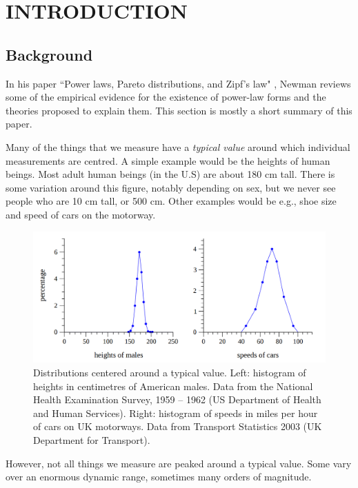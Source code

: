 \documentclass[a4paper, 12pt]{report}
\begin{document}
\chapter{INTRODUCTION}

\section{Background}
In his paper ``Power laws, Pareto distributions, and Zipf’s law" \cite{newman}, Newman reviews some of the empirical evidence for the existence of power-law forms and the theories proposed to explain them. This section is mostly a short summary of this paper.

Many of the things that we measure have a \textit{typical value} around which individual measurements are centred. A simple example would be the heights of human beings. Most adult human beings (in the U.S) are about 180 cm tall. There is some variation around this figure, notably depending on sex, but we never see people who are 10 cm tall, or 500 cm. Other examples would be e.g., shoe size and speed of cars on the motorway.

\begin{figure}[!ht]
\centering
\includegraphics[width=0.7\linewidth]{./heights-of-males}
\caption{
    Distributions centered around a typical value.  
    Left: histogram of heights in centimetres of American males. Data from the National Health Examination Survey,
    1959 – 1962 (US Department of Health and Human Services). Right: histogram of speeds in miles per hour of cars on UK
    motorways. Data from Transport Statistics 2003 (UK Department for Transport).
}

\label{fig:heights-of-males}
\end{figure}

However, not all things we measure are peaked around a typical value. Some vary over an enormous dynamic range, sometimes many orders of magnitude. 
\end{document}
